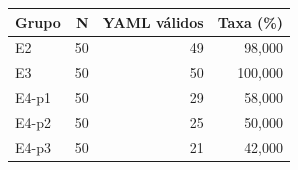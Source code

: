 \begin{tabular}{lrrr}
\toprule
Grupo & N & YAML válidos & Taxa (\%) \\
\midrule
E2 & 50 & 49 & 98,000 \\
E3 & 50 & 50 & 100,000 \\
E4-p1 & 50 & 29 & 58,000 \\
E4-p2 & 50 & 25 & 50,000 \\
E4-p3 & 50 & 21 & 42,000 \\
\bottomrule
\end{tabular}
